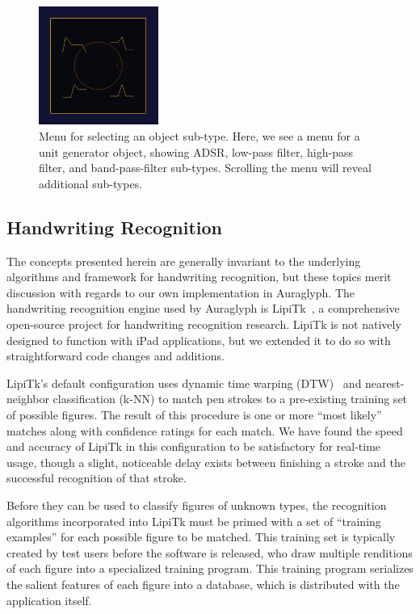 \documentclass[10pt,letterpaper]{article}
\begin{document}
\begin{figure}[h]
	\centering
		\includegraphics[width=0.35\textwidth]{figures/menu.png}
	\caption{Menu for selecting an object sub-type. Here, we see a menu for a unit generator object, showing ADSR, low-pass filter, high-pass filter, and band-pass-filter sub-types. Scrolling the menu will reveal additional sub-types.}
	\label{fig:objectMenu}
\end{figure}

\subsection{Handwriting Recognition}
\label{sec:HandwritingRecognition}

The concepts presented herein are generally invariant to the underlying algorithms and framework for handwriting recognition, but these topics merit discussion with regards to our own implementation in Auraglyph. 
The handwriting recognition engine used by Auraglyph is LipiTk~\cite{madhvanath2007lipitk}, a comprehensive open-source project for handwriting recognition research. 
LipiTk is not natively designed to function with iPad applications, but we extended it to do so with straightforward code changes and additions. 

LipiTk's default configuration uses dynamic time warping (DTW)~\cite{niels2005using} and nearest-neighbor classification (k-NN) to match pen strokes to a pre-existing training set of possible figures. 
The result of this procedure is one or more ``most likely'' matches along with confidence ratings for each match. 
We have found the speed and accuracy of LipiTk in this configuration to be satisfactory for real-time usage, though a slight, noticeable delay exists between finishing a stroke and the successful recognition of that stroke. 

Before they can be used to classify figures of unknown types, the recognition algorithms incorporated into LipiTk must be primed with a set of ``training examples'' for each possible figure to be matched. 
This training set is typically created by test users before the software is released, who draw multiple renditions of each figure into a specialized training program. 
This training program serializes the salient features of each figure into a database, which is distributed with the application itself. 
\end{document}
